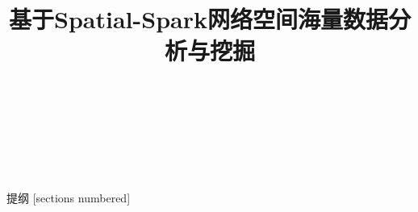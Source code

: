 \documentclass{beamer}
\title{基于Spatial-Spark网络空间海量数据分析与挖掘}
\author[高峰]{
    \makebox[2.5em][s]{姓名:} \makebox[3em][s]{高峰}\\
    \makebox[2.5em][s]{导师:} \makebox[3em][s]{高井祥} \\
    \makebox[2.5em][s]{} \makebox[3em]{孙久运} \\
    \makebox[2.5em][s]{专业:} \makebox[10em][l]{大地测量学与测量工程}\\
}
\date{}
\begin{document}
\maketitle

\begin{frame}{提纲}
  [sections numbered]
  \tableofcontents[hideallsubsections]
\end{frame}



        




\end{document}
